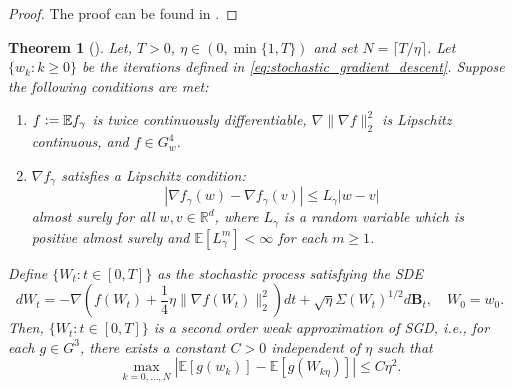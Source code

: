 \documentclass[12pt]{article}
\newtheorem{theorem}{Theorem}[section]
\theoremstyle{definition}
\numberwithin{equation}{section}
\newcommand{\R}{\mathbb{R}}
\newcommand{\E}{\mathbb{E}}
\newcommand{\ev}[1]{\mathbb{E}\left[{#1}\right]}
\newcommand{\norm}[1]{\lVert{#1}\rVert_2}
\newcommand{\defeq}{\vcentcolon=}
\begin{document}
\begin{proof}
  The proof can be found in \cite[Lemma 29]{liStochasticModifiedEquations2019}.
\end{proof}
\begin{theorem}[\autocite{liStochasticModifiedEquations2019}]
  \label{thm:second_order}
  Let, $T > 0$, $\eta \in (0, \min\{1,T\})$ and set $N = \lceil T/\eta \rceil$. Let $\{w_k:k\geq 0\}$ be the iterations defined in \eqref{eq:stochastic_gradient_descent}. Suppose the following conditions are met:
  \begin{enumerate}[label=(\roman*)]
    \item $f \defeq \E f_{\gamma}$ is twice continuously differentiable, $\nabla \norm{\nabla f} ^2$ is Lipschitz continuous, and $f \in G^4_w$.
    \item $\nabla f_{\gamma}$ satisfies a Lipschitz condition:
    \begin{equation*}
      |\nabla f_{\gamma}(w) - \nabla f_{\gamma}(v)| \leq L_{\gamma} |w - v|
    \end{equation*}
    almost surely for all $w,v \in \R^d$, where $L_{\gamma}$ is a random variable which is positive almost surely and $\ev{L_{\gamma}^m} < \infty$ for each $m \geq 1$.
  \end{enumerate}
  Define $\{W_t:t\in [0,T] \}$ as the stochastic process satisfying the SDE
  \begin{equation}
    \label{eq:second_order_sde}
    d W_t = -\nabla\left(f(W_t) + \frac{1}{4}\eta \norm{\nabla f(W_t)}^2\right)dt + \sqrt{\eta}\Sigma(W_t)^{1/2}d\mathbf{B}_t, \quad W_0 = w_0.
  \end{equation}
  Then, $\{W_t:t\in [0,T] \}$ is a second order weak approximation of SGD, i.e., for each $g \in G^3$, there exists a constant $C > 0$ independent of $\eta$ such that
  \begin{equation}
    \label{eq:second_order_convergence}
    \max_{k=0,\dots,N} |\ev{g(w_k)} - \ev{g(W_{k\eta})}| \leq C \eta^2.
  \end{equation}
\end{theorem}
\end{document}
